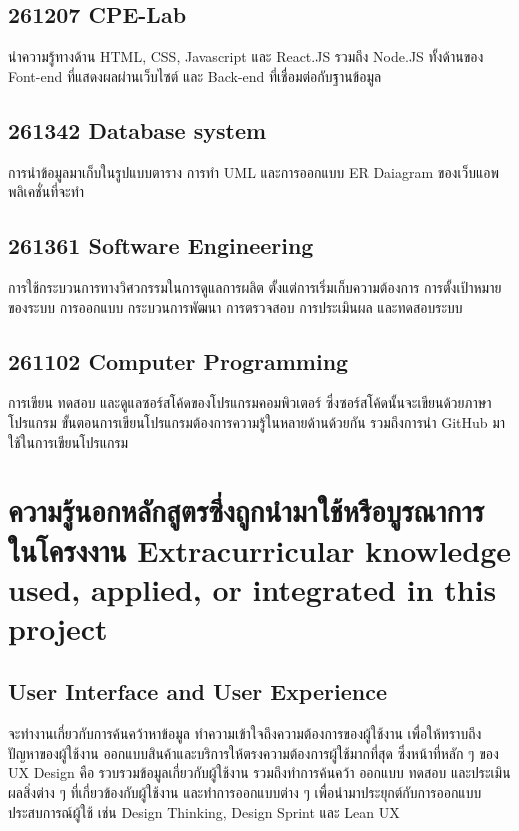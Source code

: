 \subsection*{261207 CPE-Lab}
นำความรู้ทางด้าน HTML, CSS, Javascript และ React.JS รวมถึง Node.JS 
ทั้งด้านของ Font-end ที่แสดงผลผ่านเว็บไซต์ และ Back-end ที่เชื่อมต่อกับฐานข้อมูล

\subsection*{261342 Database system}
การนำข้อมูลมาเก็บในรูปแบบตาราง การทำ UML และการออกแบบ ER Daiagram ของเว็บแอพพลิเคชั่นที่จะทำ
\subsection*{261361 Software Engineering}
การใช้กระบวนการทางวิศวกรรมในการดูแลการผลิต ตั้งแต่การเริ่มเก็บความต้องการ การตั้งเป้าหมายของระบบ 
การออกแบบ กระบวนการพัฒนา การตรวจสอบ การประเมินผล และทดสอบระบบ
\subsection{261102 Computer Programming}
การเขียน ทดสอบ และดูแลซอร์สโค้ดของโปรแกรมคอมพิวเตอร์ ซึ่งซอร์สโค้ดนั้นจะเขียนด้วยภาษาโปรแกรม 
ขั้นตอนการเขียนโปรแกรมต้องการความรู้ในหลายด้านด้วยกัน รวมถึงการนำ GitHub มาใช้ในการเขียนโปรแกรม

\section{\ifcpe%
ความรู้นอกหลักสูตรซึ่งถูกนำมาใช้หรือบูรณาการในโครงงาน
\else%
Extracurricular knowledge used, applied, or integrated in this project
\fi
}
\subsection*{User Interface and User Experience}
จะทำงานเกี่ยวกับการค้นคว้าหาข้อมูล ทำความเข้าใจถึงความต้องการของผู้ใช้งาน เพื่อให้ทราบถึงปัญหาของผู้ใช้งาน
ออกแบบสินค้าและบริการให้ตรงความต้องการผู้ใช้มากที่สุด ซึ่งหน้าที่หลัก ๆ ของ UX Design คือ 
รวบรวมข้อมูลเกี่ยวกับผู้ใช้งาน รวมถึงทำการค้นคว้า ออกแบบ ทดสอบ และประเมินผลสิ่งต่าง ๆ 
ที่เกี่ยวข้องกับผู้ใช้งาน และทำการออกแบบต่าง ๆ เพื่อนำมาประยุกต์กับการออกแบบประสบการณ์ผู้ใช้
 เช่น Design Thinking, Design Sprint และ Lean UX






